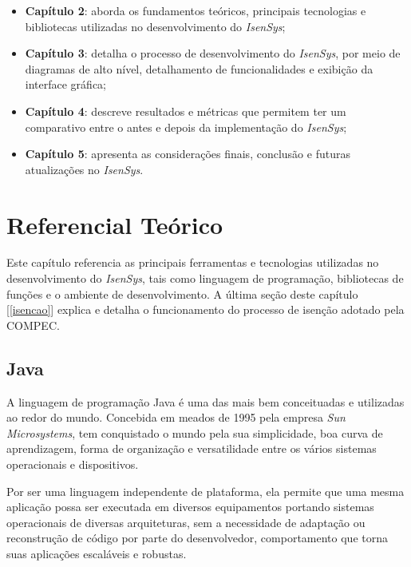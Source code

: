 \documentclass[
	12pt,			%
	openright,		%
	oneside,	
	a4paper,		%
	english,		%
	brazil			%
]{abntex2/abntex2}  %
\begin{document}
			\begin{itemize}
				
				\item \textbf{Capítulo 2}: aborda os fundamentos teóricos, principais tecnologias e bibliotecas utilizadas no desenvolvimento do \textit{IsenSys};
				\item \textbf{Capítulo 3}: detalha o processo de desenvolvimento do \textit{IsenSys}, por meio de diagramas de alto nível, detalhamento de funcionalidades e exibição da interface gráfica;
				\item \textbf{Capítulo 4}: descreve resultados e métricas que permitem ter um comparativo entre o antes e depois da implementação do \textit{IsenSys};
				\item \textbf{Capítulo 5}: apresenta as considerações finais, conclusão e futuras atualizações no \textit{IsenSys}.
				
			\end{itemize}
	
	\chapter{Referencial Teórico}
	
		Este capítulo referencia as principais ferramentas e tecnologias utilizadas no desenvolvimento do \textit{IsenSys}, tais como linguagem de programação, bibliotecas de funções e o ambiente de desenvolvimento. A última seção deste capítulo [\ref{isencao}] explica e detalha o funcionamento do processo de isenção adotado pela COMPEC.
		
		\section{Java}
		
			A linguagem de programação Java \cite{java} é uma das mais bem conceituadas e utilizadas ao redor do mundo. Concebida em meados de 1995 pela empresa \textit{Sun Microsystems}, tem conquistado o mundo pela sua simplicidade, boa curva de aprendizagem, forma de organização e versatilidade entre os vários sistemas operacionais e dispositivos.
		
			Por ser uma linguagem independente de plataforma, ela permite que uma mesma aplicação possa ser executada em diversos equipamentos portando sistemas operacionais de diversas arquiteturas, sem a necessidade de adaptação ou reconstrução de código por parte do desenvolvedor, comportamento que torna suas aplicações escaláveis e robustas.
		
\end{document}
